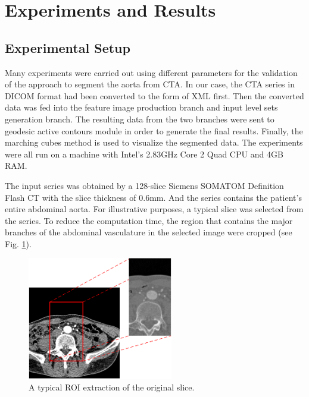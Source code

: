 \section{Experiments and Results}

\subsection{Experimental Setup}
Many experiments were carried out using different parameters for the validation of the approach to segment the aorta from CTA.
In our case, the CTA series in DICOM format had been converted to the form of XML first.
Then the converted data was fed into the feature image production branch and input level sets generation branch.
The resulting data from the two branches were sent to geodesic active contours module in order to generate the final results.
Finally, the marching cubes method is used to visualize the segmented data.
The experiments were all run on a machine with Intel's 2.83GHz Core 2 Quad CPU and 4GB RAM.

The input series was obtained by a 128-slice Siemens SOMATOM Definition Flash CT with the slice thickness of 0.6mm.
And the series contains the patient's entire abdominal aorta.
For illustrative purposes, a typical slice was selected from the series.
To reduce the computation time, the region that contains the major branches of the abdominal vasculature in the selected image were cropped (see Fig. \ref{fig_roi}).
\begin{figure}[t]
\centering
\includegraphics[width=2.5in]{Figures/chap03/ROI.png}
\caption{A typical ROI extraction of the original slice.}
\label{fig_roi}
\end{figure}

